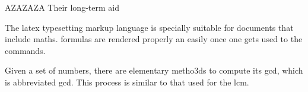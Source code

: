 \documentclass[a4paper,11pt]{report} %
\begin{document}

 
\begin{spacing}{1.2}
\setcounter{page}{1}
\tableofcontents 
\end{spacing} 
\newpage











\newpage
AZAZAZA
Their long-term aid ~\cite{Haggarty:01} ~\cite{Haggarty:02}

The \Gls{latex} typesetting markup language is specially suitable 
for documents that include \gls{maths}. \Glspl{formula} are 
rendered properly an easily once one gets used to the commands.
 
Given a set of numbers, there are elementary metho3ds to compute 
its \acrlong{gcd}, which is abbreviated \acrshort{gcd}. This 
process is similar to that used for the \acrfull{lcm}.

\renewcommand{\bibname}{References}




\end{document}
